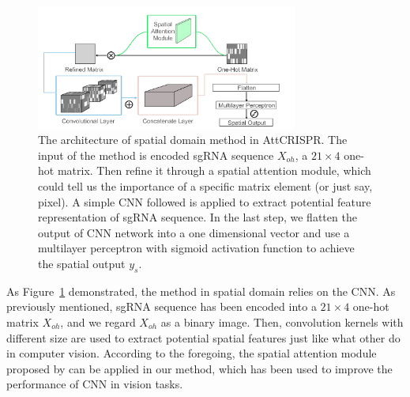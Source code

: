 \documentclass{bioinfo}
\begin{document}
\begin{figure}[!tpb]%
    \centerline{\includegraphics[width=86mm]{CNNv2.png}}
    \caption{The architecture of spatial domain method in AttCRISPR. 
    The input of the method is encoded sgRNA sequence $X_{oh}$, a $21\times 4$ one-hot matrix. 
    Then refine it through a spatial attention module, which could tell us the importance of a specific matrix element (or just say, pixel).
    A simple CNN followed is applied to extract potential feature representation of sgRNA sequence.
    In the last step, we flatten the output of CNN network into a one dimensional vector and 
    use a multilayer perceptron with sigmoid activation function to achieve the spatial output $y_s$.}\label{fig:CNN}
\end{figure}

As Figure~\ref{fig:CNN} demonstrated, the method in spatial domain relies on the CNN. 
As previously mentioned, sgRNA sequence has been encoded into a $21\times 4$ one-hot matrix $X_{oh}$, and we regard $X_{oh}$ as a binary image. 
Then, convolution kernels with different size are used to extract potential spatial features just like what other do in computer vision. 
According to the foregoing, the spatial attention module proposed by \citeauthor{woo2018cbam:} can be applied in our method, 
which has been used to improve the performance of CNN in vision tasks.
\end{document}

